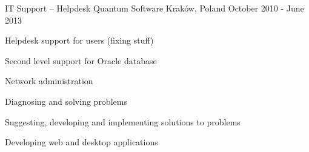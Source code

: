 \begin{cventries}
  \cventry
    {IT Support -- Helpdesk} %
    {Quantum Software} %
    {Kraków, Poland} %
    {October 2010 - June 2013} %
    {
      \begin{cvitems} %
        \item {Helpdesk support for users (fixing stuff)}
            		\item {Second level support for Oracle database}
            		\item {Network administration}
            		\item {Diagnosing and solving problems}
            		\item {Suggesting, developing and implementing solutions to problems}
            		\item {Developing web and desktop applications}
      \end{cvitems}
    }
\end{cventries}
